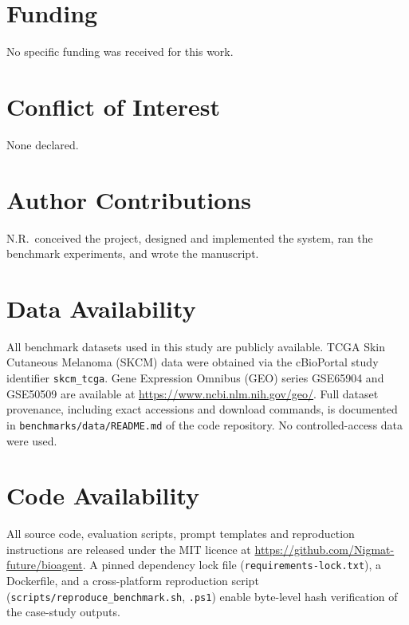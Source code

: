 \documentclass[11pt]{article}
\begin{document}
\section*{Funding}
No specific funding was received for this work.

\section*{Conflict of Interest}
None declared.

\section*{Author Contributions}
N.R.\ conceived the project, designed and implemented the system,
ran the benchmark experiments, and wrote the manuscript.

\section*{Data Availability}
All benchmark datasets used in this study are publicly available.
TCGA Skin Cutaneous Melanoma (SKCM) data were obtained via the cBioPortal
study identifier \texttt{skcm\_tcga}.
Gene Expression Omnibus (GEO) series GSE65904 and GSE50509 are available at
\url{https://www.ncbi.nlm.nih.gov/geo/}.
Full dataset provenance, including exact accessions and download commands,
is documented in \texttt{benchmarks/data/README.md} of the code repository.
No controlled-access data were used.

\section*{Code Availability}
All source code, evaluation scripts, prompt templates and reproduction
instructions are released under the MIT licence at
\url{https://github.com/Nigmat-future/bioagent}.
A pinned dependency lock file
(\texttt{requirements-lock.txt}), a Dockerfile, and a cross-platform
reproduction script (\texttt{scripts/reproduce\_benchmark.sh},
\texttt{.ps1}) enable byte-level hash verification of the case-study
outputs.



\end{document}
